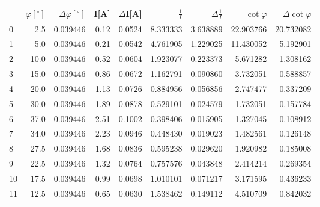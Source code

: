 \begin{tabular}{lrrrrrrrr}
\toprule
{} &  $\varphi[^\circ]$ &  $\Delta \varphi[^\circ]$ &  I[A] &  $\Delta$I[A] &  $\frac{1}{I}$ &  $\Delta \frac{1}{I}$ &  $\cot{\varphi}$ &  $\Delta \cot{\varphi}$ \\
\midrule
0  &                2.5 &                  0.039446 &  0.12 &        0.0524 &       8.333333 &              3.638889 &        22.903766 &               20.732082 \\
1  &                5.0 &                  0.039446 &  0.21 &        0.0542 &       4.761905 &              1.229025 &        11.430052 &                5.192901 \\
2  &               10.0 &                  0.039446 &  0.52 &        0.0604 &       1.923077 &              0.223373 &         5.671282 &                1.308162 \\
3  &               15.0 &                  0.039446 &  0.86 &        0.0672 &       1.162791 &              0.090860 &         3.732051 &                0.588857 \\
4  &               20.0 &                  0.039446 &  1.13 &        0.0726 &       0.884956 &              0.056856 &         2.747477 &                0.337209 \\
5  &               30.0 &                  0.039446 &  1.89 &        0.0878 &       0.529101 &              0.024579 &         1.732051 &                0.157784 \\
6  &               37.0 &                  0.039446 &  2.51 &        0.1002 &       0.398406 &              0.015905 &         1.327045 &                0.108912 \\
7  &               34.0 &                  0.039446 &  2.23 &        0.0946 &       0.448430 &              0.019023 &         1.482561 &                0.126148 \\
8  &               27.5 &                  0.039446 &  1.68 &        0.0836 &       0.595238 &              0.029620 &         1.920982 &                0.185008 \\
9  &               22.5 &                  0.039446 &  1.32 &        0.0764 &       0.757576 &              0.043848 &         2.414214 &                0.269354 \\
10 &               17.5 &                  0.039446 &  0.99 &        0.0698 &       1.010101 &              0.071217 &         3.171595 &                0.436233 \\
11 &               12.5 &                  0.039446 &  0.65 &        0.0630 &       1.538462 &              0.149112 &         4.510709 &                0.842032 \\
\bottomrule
\end{tabular}
